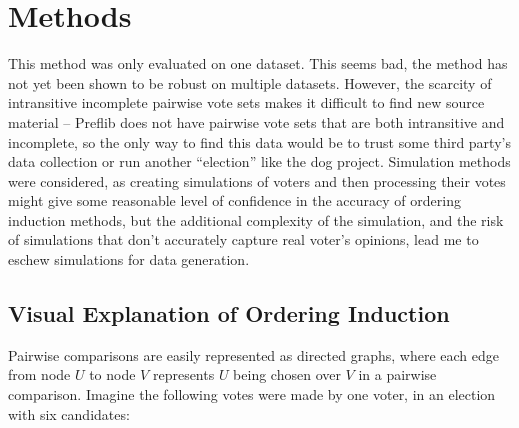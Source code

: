 \documentclass{article}
\begin{document}
\section{Methods}
This method was only evaluated on one dataset. This seems bad, the method has not yet been shown to be robust on multiple datasets. However, the scarcity of intransitive incomplete pairwise vote sets makes it difficult to find new source material -- Preflib does not have pairwise vote sets that are both intransitive and incomplete, so the only way to find this data would be to trust some third party's data collection or run another ``election'' like the dog project. Simulation methods were considered, as creating simulations of voters and then processing their votes might give some reasonable level of confidence in the accuracy of ordering induction methods, but the additional complexity of the simulation, and the risk of simulations that don't accurately capture real voter's opinions, lead me to eschew simulations for data generation.

\subsection{Visual Explanation of Ordering Induction}
Pairwise comparisons are easily represented as directed graphs, where each edge from node $U$ to node $V$ represents $U$ being chosen over $V$ in a pairwise comparison. Imagine the following votes were made by one voter, in an election with six candidates:

\begin{center}
\end{center}
\end{document}

